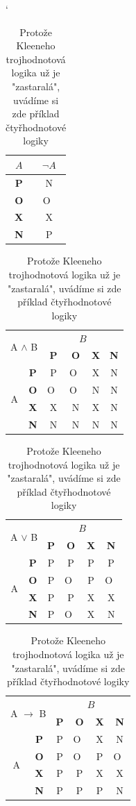 \documentclass[11pt,a4paper,oneside]{article}
\begin{document}
	\begin{table}[h]
	\catcode`
	\centering
	\begin{tabular}{|c|c|}
	\hline
	$A$ & $\neg{A}$ \\ \hline
	\textbf{P} & N \\ \hline
	\textbf{O} & O~\\ \hline
	\textbf{X} & X \\ \hline
	\textbf{N} & P \\ \hline
	\end{tabular}
	\begin{tabular}{|c|c|c|c|c|c|}
	\hline
	\multicolumn{2}{|c|}{\multirow{2}{*}{A $\land$ B}} & \multicolumn{4}{c|}{$B$} \\ \cline{3-6} 
	\multicolumn{2}{|c|}{} & \textbf{P} & \textbf{O} & \textbf{X} & \textbf{N} \\ \hline
	\multirow{4}{*}{A} & \textbf{P} & P & O~& X & N \\ \cline{2-6} 
	 & \textbf{O} & O~& O~& N & N \\ \cline{2-6} 
	 & \textbf{X} & X & N & X & N \\ \cline{2-6} 
	 & \textbf{N} & N & N & N & N \\ \hline
	\end{tabular}
	\begin{tabular}{|c|c|c|c|c|c|}
	\hline
	\multicolumn{2}{|c|}{\multirow{2}{*}{A $\lor$ B}} & \multicolumn{4}{c|}{$B$} \\ \cline{3-6} 
	\multicolumn{2}{|c|}{} & \textbf{P} & \textbf{O} & \textbf{X} & \textbf{N} \\ \hline
	\multirow{4}{*}{A} & \textbf{P} & P & P & P & P \\ \cline{2-6} 
	 & \textbf{O} & P & O~& P & O~\\ \cline{2-6} 
	 & \textbf{X} & P & P & X & X \\ \cline{2-6} 
	 & \textbf{N} & P & O~& X & N \\ \hline
	\end{tabular}
	\begin{tabular}{|c|c|c|c|c|c|}
	\hline
	\multicolumn{2}{|c|}{\multirow{2}{*}{A $\rightarrow$ B}} & \multicolumn{4}{c|}{$B$} \\ \cline{3-6} 
	\multicolumn{2}{|c|}{} & \textbf{P} & \textbf{O} & \textbf{X} & \textbf{N} \\ \hline
	\multirow{4}{*}{A} & \textbf{P} & P & O~& X & N \\ \cline{2-6} 
	 & \textbf{O} & P & O~& P & O~\\ \cline{2-6} 
	 & \textbf{X} & P & P & X & X \\ \cline{2-6} 
	 & \textbf{N} & P & P & P & N \\ \hline
	\end{tabular}
	\caption{Protože Kleeneho trojhodnotová logika už je "zastaralá", uvádíme si zde příklad čtyřhodnotové logiky }
	\label{fig:tab2}
	\end{table}
	
\end{document}
